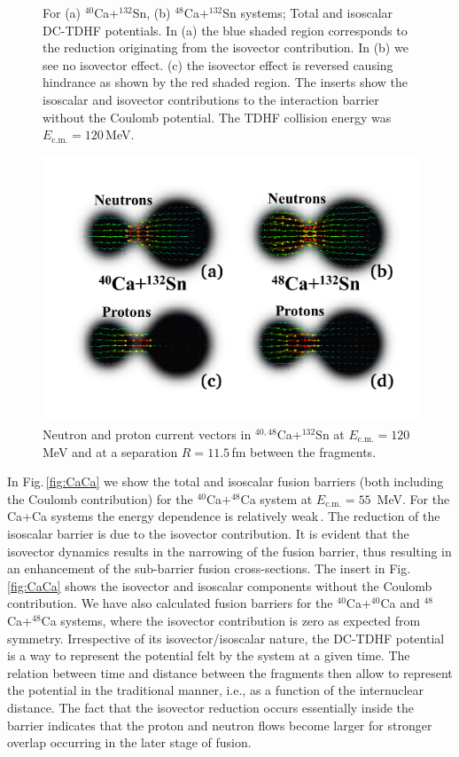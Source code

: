 \begin{figure}
	\caption{For     (a) $^{40}$Ca+$^{132}$Sn,
		(b) $^{48}$Ca+$^{132}$Sn
		systems;
		Total and isoscalar DC-TDHF potentials. In (a) the blue shaded region
		corresponds to the reduction originating from the isovector contribution.
		In (b) we see no isovector effect. (c) the isovector effect is reversed
		causing hindrance as shown by the red shaded region.
		The inserts show the isoscalar and isovector contributions to the interaction barrier without the Coulomb potential.
		The TDHF collision energy was $E_\mathrm{c.m.}=120$\,MeV.}
	\label{fig:CaSn_1}
\end{figure}
\begin{figure}
	\centering
	\includegraphics*[width=\textwidth]{../Figures/Isospin/current.pdf}
	\caption{Neutron and proton current vectors in $^{40,48}$Ca+$^{132}$Sn at $E_\mathrm{c.m.}=120$\,MeV and at
		a separation  $R=11.5$\,fm between the fragments.}
	\label{fig:current}
\end{figure}

In Fig.\,\ref{fig:CaCa} we show the total and isoscalar fusion barriers (both including the Coulomb contribution)
for the $^{40}$Ca+$^{48}$Ca system at $E_\mathrm{c.m.}=55$~MeV.
For the Ca+Ca systems the energy dependence is relatively
weak\,\citep{keser2012,umar2014a,washiyama2008}.
The reduction of the isoscalar barrier is due to the isovector contribution. It is evident that
the isovector dynamics results in the narrowing of the fusion barrier, thus resulting in an enhancement of the sub-barrier
fusion cross-sections. The insert in Fig.\,\ref{fig:CaCa} shows the isovector and isoscalar components without the Coulomb contribution.
We have also calculated fusion barriers for the $^{40}$Ca+$^{40}$Ca and $^{48}$Ca+$^{48}$Ca systems, where the isovector contribution is
zero as expected from symmetry.
Irrespective of its isovector/isoscalar nature, the DC-TDHF potential is a way to represent the potential felt by the system at a given time. The relation between time and distance between the fragments then allow to represent the potential in the traditional manner, i.e., as a function of the internuclear distance. The fact that the isovector reduction occurs essentially inside the barrier indicates that the proton and neutron flows become larger for stronger overlap occurring in the later stage of fusion.


